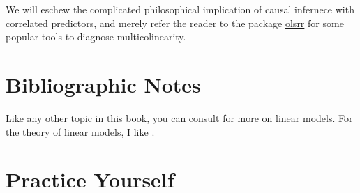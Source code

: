 \documentclass[]{book}
\theoremstyle{definition}
\theoremstyle{definition}
\theoremstyle{definition}
\theoremstyle{remark}
\begin{document}
We will eschew the complicated philosophical implication of causal
infernece with correlated predictors, and merely refer the reader to the
package
\href{https://cran.r-project.org/web/packages/olsrr/vignettes/regression_diagnostics.html}{olsrr}
for some popular tools to diagnose multicolinearity.

\section{Bibliographic Notes}\label{bibliographic-notes-4}

Like any other topic in this book, you can consult
\citet{venables2013modern} for more on linear models. For the theory of
linear models, I like \citet{greene2003econometric}.

\section{Practice Yourself}\label{practice-yourself-3}
\end{document}
